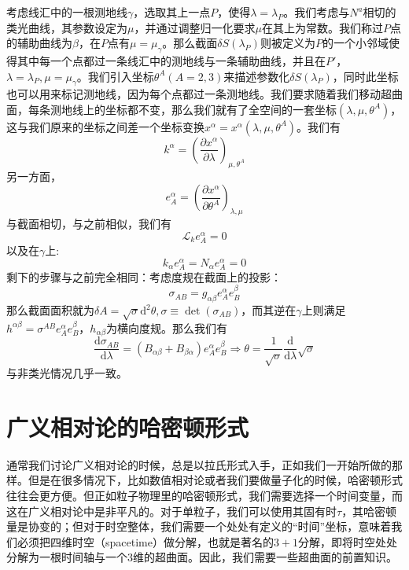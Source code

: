 \documentclass[hyperref, UTF8, a4paper]{ctexart}
\begin{document}
考虑线汇中的一根测地线$\gamma $，选取其上一点$P$，使得$\lambda =\lambda _{P}$。我们考虑与$N^{a}$相切的类光曲线，其参数设定为$\mu $，并通过调整归一化要求$\mu $在其上为常数。我们称过$P$点的辅助曲线为$\beta $，在$P$点有$\mu =\mu _{\gamma }$。那么截面$\delta S( \lambda _{P})$则被定义为$P$的一个小邻域使得其中每一个点都过一条线汇中的测地线与一条辅助曲线，并且在$P'$，$\lambda =\lambda _{P} ,\mu =\mu _{\gamma }$。我们引入坐标$\theta ^{A}( A=2,3)$来描述参数化$\delta S( \lambda _{P})$，同时此坐标也可以用来标记测地线，因为每个点都过一条测地线。我们要求随着我们移动超曲面，每条测地线上的坐标都不变，那么我们就有了全空间的一套坐标$(\lambda ,\mu ,\theta ^{A} )$，这与我们原来的坐标之间差一个坐标变换$x^{\alpha } =x^{\alpha } (\lambda ,\mu ,\theta ^{A} )$。我们有
\begin{equation*}
	k^{\alpha } =\left(\frac{\partial x^{\alpha }}{\partial \lambda }\right)_{\mu ,\theta ^{A}}
\end{equation*}
另一方面，
\begin{equation*}
	e_{A}^{\alpha } =\left(\frac{\partial x^{\alpha }}{\partial \theta ^{A}}\right)_{\lambda ,\mu }
\end{equation*}
与截面相切，与之前相似，我们有
\begin{equation*}
	\mathcal{L}_{k} e_{A}^{\alpha } =0
\end{equation*}
以及在$\gamma $上:
\begin{equation*}
	k_{\alpha } e_{A}^{\alpha } =N_{\alpha } e_{A}^{\alpha } =0
\end{equation*}
剩下的步骤与之前完全相同：考虑度规在截面上的投影：
\begin{equation*}
	\sigma _{AB} =g_{\alpha \beta } e_{A}^{\alpha } e_{B}^{\beta }
\end{equation*}
那么截面面积就为$\delta A=\sqrt{\sigma }\mathrm{d}^{2} \theta ,\sigma \equiv \det (\sigma _{AB} )$，而其逆在$\gamma $上则满足$h^{\alpha \beta } =\sigma ^{AB} e_{A}^{\alpha } e_{B}^{\beta }$，$h_{\alpha \beta }$为横向度规。那么我们有
\begin{equation*}
	\frac{\mathrm{d} \sigma _{AB}}{\mathrm{d} \lambda } =( B_{\alpha \beta } +B_{\beta \alpha }) e_{A}^{\alpha } e_{B}^{\beta } \Rightarrow \theta =\frac{1}{\sqrt{\sigma }}\frac{\mathrm{d}}{\mathrm{d} \lambda }\sqrt{\sigma }
\end{equation*}
与非类光情况几乎一致。

\section{广义相对论的哈密顿形式}
通常我们讨论广义相对论的时候，总是以拉氏形式入手，正如我们一开始所做的那样。但是在很多情况下，比如数值相对论或者我们要做量子化的时候，哈密顿形式往往会更方便。但正如粒子物理里的哈密顿形式，我们需要选择一个时间变量，而这在广义相对论中是非平凡的。对于单粒子，我们可以使用其固有时$\tau $，其哈密顿量是协变的；但对于时空整体，我们需要一个处处有定义的“时间”坐标，意味着我们必须把四维时空（spacetime）做分解，也就是著名的$3+1$分解，即将时空处处分解为一根时间轴与一个3维的超曲面。因此，我们需要一些超曲面的前置知识。
\end{document}
